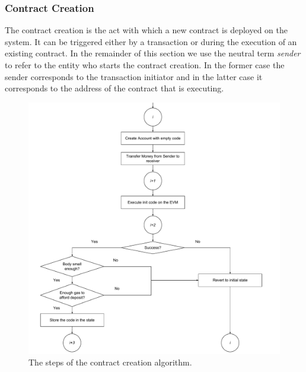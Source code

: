 \subsubsection{Contract Creation}
\label{sec:contract-creation}
The contract creation is the act with which a new contract is deployed
on the system. It can be triggered either by a transaction or during the 
execution of an existing contract. In the remainder of this section we 
use the neutral term \textit{sender} to refer to the entity who starts
the contract creation. In the former case the sender corresponds to the
transaction initiator and in the latter case it corresponds to the address
of the contract that is executing.

\begin{figure}
	\begin{center}
		\includegraphics[width=\textwidth]{./res/img/contract-creation.pdf}
	\end{center}
	\caption{The steps of the contract creation algorithm.}
	\label{fig:contract-creation}
\end{figure}

